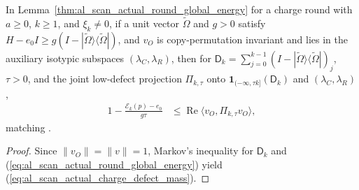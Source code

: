 \begin{lemma}
    \label{thm:al_scan_actual_charge_defect_mass}
    \leanok
    In Lemma~\ref{thm:al_scan_actual_round_global_energy} for a charge round
    with $a\ge0$, $k\ge1$, and $\xi_k\ne0$, if a unit vector $\widetilde\Omega$
    and $g>0$ satisfy $H-e_0I\ge g(I-|\widetilde\Omega\rangle\langle\widetilde\Omega|)$,
    and $v_O$ is copy-permutation invariant and lies in the auxiliary isotypic
    subspaces $(\lambda_C,\lambda_R)$, then for
    $\mathsf D_k=\sum_{j=0}^{k-1}(I-|\widetilde\Omega\rangle\langle\widetilde\Omega|)_j$,
    $\tau>0$, and the joint low-defect projection $\Pi_{k,\tau}$ onto
    $\mathbf 1_{(-\infty,\tau k]}(\mathsf D_k)$ and $(\lambda_C,\lambda_R)$,
    \begin{align}
        1-\frac{\mathcal E_k(p)-e_0}{g\tau}
         & \le\operatorname{Re}\langle v_O,\Pi_{k,\tau}v_O\rangle,
        \label{eq:al_scan_actual_charge_defect_mass}
    \end{align}
    matching \cite[Section~8, defect-mass comparison]{OpenAI2026AreaLaw}.
\end{lemma}
\begin{proof}\leanok
    Since $\|v_O\|=\|v\|=1$, Markov's inequality for $\mathsf D_k$ and
    (\ref{eq:al_scan_actual_round_global_energy}) yield
    (\ref{eq:al_scan_actual_charge_defect_mass}).
\end{proof}


